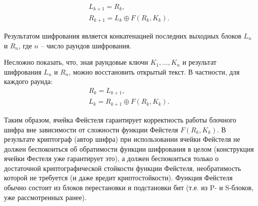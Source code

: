 \[\begin{array}{l}
    L_{k+1} = R_{k}, \\
    R_{k+1} = L_{k} \oplus F\left( R_k, K_k \right).
\end{array}\]

Результатом шифрования является конкатенацией последних выходных блоков $L_n$ и $R_n$, где $n$ -- число раундов шифрования.

Несложно показать, что, зная раундовые ключи $K_1, \dots, K_n$ и результат шифрования $L_n$ и $R_n$, можно восстановить открытый текст. В частности, для каждого раунда:
\[\begin{array}{l}
    R_k = L_{k+1}, \\
    L_k = R_{k+1} \oplus F\left( R_k, K_k \right).
\end{array}\]

Таким образом, ячейка Фейстеля гарантирует корректность работы блочного шифра вне зависимости от сложности функции Фейстеля $F\left(R_k, K_k \right)$. В результате криптограф (автор шифра) при использовании ячейки Фейстеля не должен беспокоиться об обратимости функции шифрования в целом (конструкция ячейки Фестеля уже гарантирует это), а должен беспокоиться только о достаточной криптографической стойкости функции Фейстеля, необратимость которой не требуется (и даже вредит криптостойкости). Функция Фейстеля обычно состоит из блоков перестановки и подстановки бит (т.е. из P- и S-блоков, уже рассмотренных ранее).

